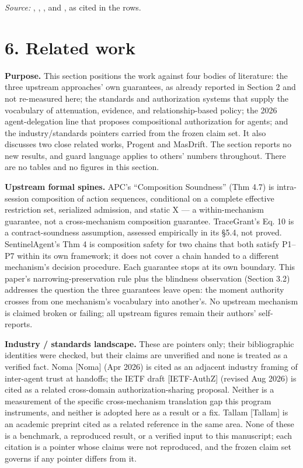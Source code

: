 \documentclass[
  10pt,
]{article}
\newcounter{none} %
\renewcommand{\_}{\allowbreak\origunderscore}
\begin{document}
\emph{Source:} ,
,
, and
, as cited in the rows.

\section{6. Related work}\label{related-work}

\textbf{Purpose.} This section positions the work against four bodies of
literature: the three upstream approaches' own guarantees, as already
reported in Section 2 and not re-measured here; the standards and
authorization systems that supply the vocabulary of attenuation,
evidence, and relationship-based policy; the 2026 agent-delegation line
that proposes compositional authorization for agents; and the
industry/standards pointers carried from the frozen claim set. It also
discusses two close related works, Progent and MasDrift. The section
reports no new results, and guard language applies to others' numbers
throughout. There are no tables and no figures in this section.

\textbf{Upstream formal spines.} APC's ``Composition Soundness'' (Thm
4.7) is intra-session composition of action sequences, conditional on a
complete effective restriction set, serialized admission, and static X
--- a within-mechanism guarantee, not a cross-mechanism composition
guarantee. TraceGrant's Eq. 10 is a contract-soundness assumption,
assessed empirically in its §5.4, not proved. SentinelAgent's Thm 4 is
composition safety for two chains that both satisfy P1--P7 within its
own framework; it does not cover a chain handed to a different
mechanism's decision procedure. Each guarantee stops at its own
boundary. This paper's narrowing-preservation rule plus the blindness
observation (Section 3.2) addresses the question the three guarantees
leave open: the moment authority crosses from one mechanism's vocabulary
into another's. No upstream mechanism is claimed broken or failing; all
upstream figures remain their authors' self-reports.

\textbf{Industry / standards landscape.} These are pointers only; their
bibliographic identities were checked, but their claims are unverified
and none is treated as a verified fact. Noma {[}Noma{]} (Apr 2026) is
cited as an adjacent industry framing of inter-agent trust at handoffs;
the IETF draft {[}IETF-AuthZ{]} (revised Aug 2026) is cited as a related
cross-domain authorization-sharing proposal. Neither is a measurement of
the specific cross-mechanism translation gap this program instruments,
and neither is adopted here as a result or a fix. Tallam {[}Tallam{]} is
an academic preprint cited as a related reference in the same area. None
of these is a benchmark, a reproduced result, or a verified input to
this manuscript; each citation is a pointer whose claims were not
reproduced, and the frozen claim set governs if any pointer differs from
it.
\end{document}
